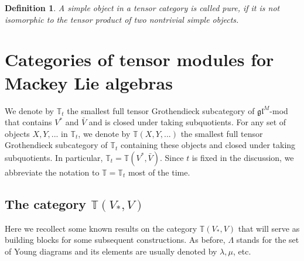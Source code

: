 \documentclass[12pt]{article}
\def\TT {{\mathbb T}}     %
\def\mk {\mathfrak}
\newtheorem{definition}{Definition}[section]
\begin{document}
\begin{definition}\label{Def pure}
A simple object in a tensor category is called {\rm pure}, if it is not isomorphic to the tensor product of two nontrivial simple objects.
\end{definition}



\section{Categories of tensor modules for Mackey Lie algebras}


We denote by $\TT_{t}$ the smallest full tensor Grothendieck subcategory of $\mk{gl}^M$-mod that contains $V^*$ and $\bar V$ and is closed under taking subquotients. For any set of objects $X,Y,...$ in $\TT_{t}$, we denote by $\TT(X,Y,...)$ the smallest full tensor Grothendieck subcategory of $\TT_t$ containing these objects and closed under taking subquotients. In particular, $\TT_t=\TT(V^*,\bar V)$. Since $t$ is fixed in the discussion, we abbreviate the notation to $\TT=\TT_t$ most of the time.


\subsection{The category $\TT(V_*,V)$}\label{Sec Vstar l po V m}

Here we recollect some known results on the category $\TT(V_*,V)$ that will serve as building blocks for some subsequent constructions. As before, $\Lambda$ stands for the set of Young diagrams and its elements are usually denoted by $\lambda,\mu$, etc.
\end{document}
